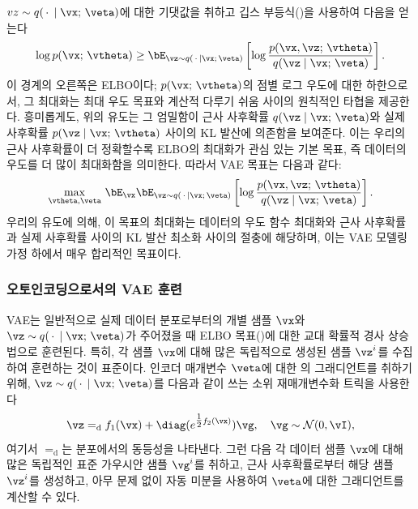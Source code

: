 \documentclass[../../book-main_ko.tex]{subfiles}
\begin{document}
$\\vz \sim q(\,\cdot\, \mid \vx ;\, \veta)$에 대한 기댓값을 취하고 깁스 부등식()을 사용하여 다음을 얻는다
\begin{equation*}
\log p(\vx;\, \vtheta) \geq \bE_{\vz \sim q(\,\cdot\, \mid \vx ;\, \veta)} \left[ \log \frac{p(\vx, \vz;\, \vtheta)}{q(\vz \mid \vx;\, \veta)}\right].
\end{equation*}
이 경계의 오른쪽은 ELBO이다; $p(\vx;\, \vtheta)$의 점별 로그 우도에 대한 하한으로서, 그 최대화는 최대 우도 목표와 계산적 다루기 쉬움 사이의 원칙적인 타협을 제공한다.
흥미롭게도, 위의 유도는 그 엄밀함이 근사 사후확률 $q(\vz \mid \vx;\, \veta)$와 실제 사후확률 $p(\vz \mid \vx;\, \vtheta)$ 사이의 KL 발산에 의존함을 보여준다. 이는 우리의 근사 사후확률이 더 정확할수록 ELBO의 최대화가 관심 있는 기본 목표, 즉 데이터의 우도를 더 많이 최대화함을 의미한다. 따라서 VAE 목표는 다음과 같다:
\begin{equation}\label{eq:elbo-objective}
\max_{\vtheta, \veta}\, \bE_{\vx}
\bE_{\vz \sim q(\,\cdot\, \mid \vx ;\, \veta)} \left[ \log \frac{p(\vx, \vz;\, \vtheta)}{q(\vz \mid \vx;\, \veta)}\right].
\end{equation}
우리의 유도에 의해, 이 목표의 최대화는 데이터의 우도 함수 최대화와 근사 사후확률과 실제 사후확률 사이의 KL 발산 최소화 사이의 절충에 해당하며, 이는 VAE 모델링 가정 하에서 매우 합리적인 목표이다.

\subsubsection{오토인코딩으로서의 VAE 훈련}

VAE는 일반적으로 실제 데이터 분포로부터의 개별 샘플 $\vx$와 $\vz \sim q(\,\cdot\, \mid \vx ;\, \veta)$가 주어졌을 때 ELBO 목표()에 대한 교대 확률적 경사 상승법으로 훈련된다. 특히, 각 샘플 $\vx$에 대해 많은 독립적으로 생성된 샘플 $\vz^{i}$를 수집하여 훈련하는 것이 표준이다. 인코더 매개변수 $\veta$에 대한 의 그래디언트를 취하기 위해, $\vz \sim q(\,\cdot\, \mid \vx ;\, \veta)$를 다음과 같이 쓰는 소위 재매개변수화 트릭을 사용한다
\begin{equation*}
\vz =_{\mathrm{d}} f_1(\vx) + \diag(e^{\tfrac{1}{2}f_2(\vx)}) \vg, \quad \vg \sim
\mathcal{N}(0, \vI),
\end{equation*}
여기서 $=_{\mathrm{d}}$는 분포에서의 동등성을 나타낸다. 그런 다음 각 데이터 샘플 $\vx$에 대해 많은 독립적인 표준 가우시안 샘플 $\vg^{i}$를 취하고, 근사 사후확률로부터 해당 샘플 $\vz^i$를 생성하고, 아무 문제 없이 자동 미분을 사용하여 $\veta$에 대한 그래디언트를 계산할 수 있다.
\end{document}
